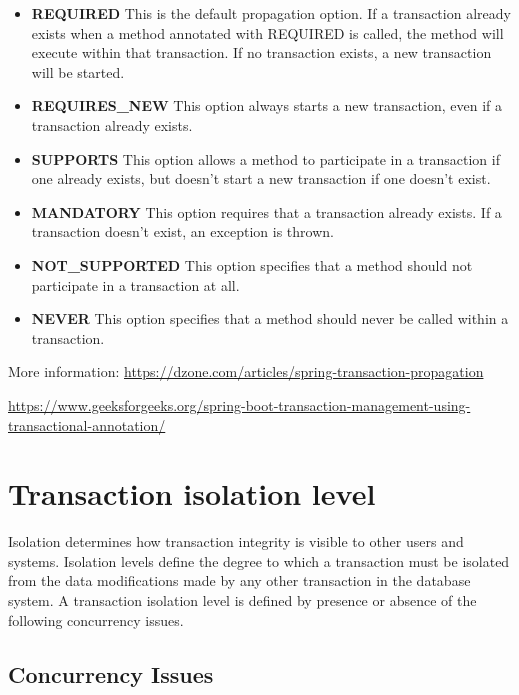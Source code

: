 \begin{itemize}
\item \textbf{REQUIRED} This is the default propagation option. If a transaction already exists when a method annotated with REQUIRED is called, the method will execute within that transaction. If no transaction exists, a new transaction will be started.

\item \textbf{REQUIRES\_NEW} This option always starts a new transaction, even if a transaction already exists.

\item \textbf{SUPPORTS} This option allows a method to participate in a transaction if one already exists, but doesn’t start a new transaction if one doesn’t exist.

\item \textbf{MANDATORY} This option requires that a transaction already exists. If a transaction doesn’t exist, an exception is thrown.

\item \textbf{NOT\_SUPPORTED} This option specifies that a method should not participate in a transaction at all.

\item \textbf{NEVER} This option specifies that a method should never be called within a transaction.
\end{itemize}

More information: \url{https://dzone.com/articles/spring-transaction-propagation}

\url{https://www.geeksforgeeks.org/spring-boot-transaction-management-using-transactional-annotation/}

\section{Transaction isolation level}

Isolation determines how transaction integrity is visible to other users and systems.
Isolation levels define the degree to which a transaction must be isolated from the data modifications made by any other transaction in the database system. A transaction isolation level is defined by presence or absence of the following concurrency issues. 

\subsection{Concurrency Issues}

